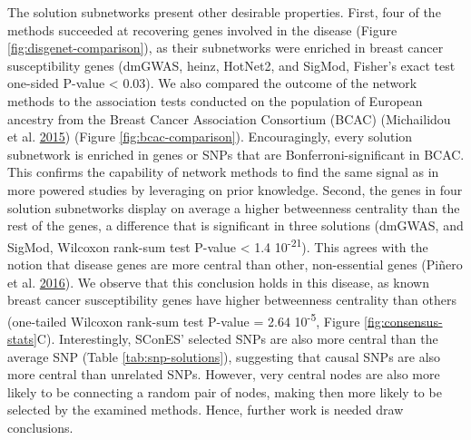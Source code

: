 \documentclass[
  11pt,
]{env/yjiao}
\begin{document}
The solution subnetworks present other desirable properties. First, four
of the methods succeeded at recovering genes involved in the disease
(Figure \ref{fig:disgenet-comparison}), as their subnetworks were
enriched in breast cancer susceptibility genes (dmGWAS, heinz, HotNet2,
and SigMod, Fisher's exact test one-sided P-value \textless{} 0.03). We also
compared the outcome of the network methods to the association tests
conducted on the population of European ancestry from the Breast Cancer
Association Consortium (BCAC) (Michailidou et al. \protect\hyperlink{ref-michailidou_genome-wide_2015}{2015})
(Figure \ref{fig:bcac-comparison}). Encouragingly, every solution
subnetwork is enriched in genes or SNPs that are Bonferroni-significant
in BCAC. This confirms the capability of network methods to find the
same signal as in more powered studies by leveraging on prior knowledge.
Second, the genes in four solution subnetworks display on average a
higher betweenness centrality than the rest of the genes, a difference
that is significant in three solutions (dmGWAS, and SigMod, Wilcoxon
rank-sum test P-value \textless{} 1.4 10\textsuperscript{-21}). This agrees with the notion that
disease genes are more central than other, non-essential genes
(Piñero et al. \protect\hyperlink{ref-pinero_uncovering_2016}{2016}). We observe that this conclusion holds in this
disease, as known breast cancer susceptibility genes have higher
betweenness centrality than others (one-tailed Wilcoxon rank-sum test
P-value = 2.64 10\textsuperscript{-5}, Figure \ref{fig:consensus-stats}C). Interestingly,
SConES' selected SNPs are also more central than the average SNP (Table
\ref{tab:snp-solutions}), suggesting that causal SNPs are
also more central than unrelated SNPs. However, very central nodes are also
more likely to be connecting a random pair of nodes, making then more
likely to be selected by the examined methods. Hence, further work is
needed draw conclusions.
\end{document}
